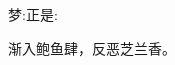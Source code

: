 \begin{parag}
    \begin{note}梦:正是:\end{note}
\end{parag}


\begin{parag}
    \begin{note}渐入鲍鱼肆，反恶芝兰香。\end{note}
\end{parag}

